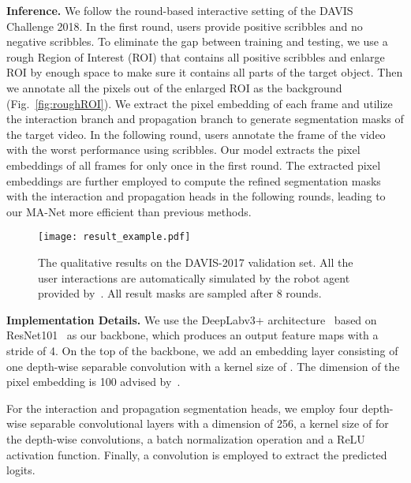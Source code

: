 \documentclass[10pt,twocolumn,letterpaper]{article}
\begin{document}
\textbf{Inference.}
We follow the round-based interactive setting of the DAVIS Challenge 2018. In the first round, users provide positive scribbles and no negative scribbles. 
To eliminate the gap between training and testing, we use a rough Region of Interest (ROI) that contains all positive scribbles and enlarge ROI by enough space to make sure it contains all parts of the target object. Then we annotate all the pixels out of the enlarged ROI as the background (Fig.~\ref{fig:roughROI}). 
We extract the pixel embedding of each frame and utilize the interaction branch and propagation branch to generate segmentation masks of the target video. In the following round, users annotate the frame of the video with the worst performance using scribbles. Our model extracts the pixel embeddings of all frames for only once in the first round. The extracted pixel embeddings are further employed to compute the refined segmentation masks with the interaction and propagation heads in the following rounds, leading to our MA-Net more efficient than previous methods.
\begin{figure*}[t]
\texttt{[image: result\_example.pdf]}
\centering
\caption{The qualitative results on the DAVIS-2017 validation set. All the user interactions are automatically simulated by the robot agent provided by~\cite{caelles20182018}. All result masks are sampled after 8 rounds.}
\vspace{-3mm}
\label{fig:result_example}
\end{figure*}


\textbf{Implementation Details.} We use the DeepLabv3+ architecture~\cite{chen2018encoder} based on ResNet101~\cite{he2016deep} as our backbone, which produces an output feature maps with a stride of 4. On the top of the backbone, we add an embedding layer consisting of one depth-wise separable convolution with a kernel size of . The dimension of the pixel embedding is 100 advised by~\cite{voigtlaender2019feelvos}.

For the interaction and propagation segmentation heads, we employ four depth-wise separable convolutional layers with a dimension of 256, a kernel size of  for the depth-wise convolutions, a batch normalization operation and a ReLU activation function. Finally, a  convolution is employed to extract the predicted logits.
\end{document}
